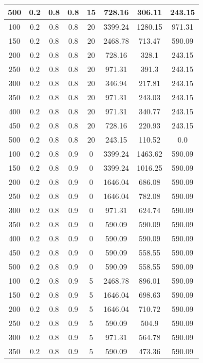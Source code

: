 \documentclass[a4paper, 12pt]{extreport}
\begin{document}
\begin{itemize}
\begin{longtable}{|c|c|c|c|c|c|c|c|}
			500 & 0.2 & 0.8 & 0.8 & 15 & 728.16 & 306.11 & 243.15 \\\hline
			100 & 0.2 & 0.8 & 0.8 & 20 & 3399.24 & 1280.15 & 971.31 \\\hline
			150 & 0.2 & 0.8 & 0.8 & 20 & 2468.78 & 713.47 & 590.09 \\\hline
			200 & 0.2 & 0.8 & 0.8 & 20 & 728.16 & 328.1 & 243.15 \\\hline
			250 & 0.2 & 0.8 & 0.8 & 20 & 971.31 & 391.3 & 243.15 \\\hline
			300 & 0.2 & 0.8 & 0.8 & 20 & 346.94 & 217.81 & 243.15 \\\hline
			350 & 0.2 & 0.8 & 0.8 & 20 & 971.31 & 243.03 & 243.15 \\\hline
			400 & 0.2 & 0.8 & 0.8 & 20 & 971.31 & 340.77 & 243.15 \\\hline
			450 & 0.2 & 0.8 & 0.8 & 20 & 728.16 & 220.93 & 243.15 \\\hline
			500 & 0.2 & 0.8 & 0.8 & 20 & 243.15 & 110.52 & 0.0 \\\hline
			100 & 0.2 & 0.8 & 0.9 & 0 & 3399.24 & 1463.62 & 590.09 \\\hline
			150 & 0.2 & 0.8 & 0.9 & 0 & 3399.24 & 1016.25 & 590.09 \\\hline
			200 & 0.2 & 0.8 & 0.9 & 0 & 1646.04 & 686.08 & 590.09 \\\hline
			250 & 0.2 & 0.8 & 0.9 & 0 & 1646.04 & 782.08 & 590.09 \\\hline
			300 & 0.2 & 0.8 & 0.9 & 0 & 971.31 & 624.74 & 590.09 \\\hline
			350 & 0.2 & 0.8 & 0.9 & 0 & 590.09 & 590.09 & 590.09 \\\hline
			400 & 0.2 & 0.8 & 0.9 & 0 & 590.09 & 590.09 & 590.09 \\\hline
			450 & 0.2 & 0.8 & 0.9 & 0 & 590.09 & 558.55 & 590.09 \\\hline
			500 & 0.2 & 0.8 & 0.9 & 0 & 590.09 & 558.55 & 590.09 \\\hline
			100 & 0.2 & 0.8 & 0.9 & 5 & 2468.78 & 896.01 & 590.09 \\\hline
			150 & 0.2 & 0.8 & 0.9 & 5 & 1646.04 & 698.63 & 590.09 \\\hline
			200 & 0.2 & 0.8 & 0.9 & 5 & 1646.04 & 710.72 & 590.09 \\\hline
			250 & 0.2 & 0.8 & 0.9 & 5 & 590.09 & 504.9 & 590.09 \\\hline
			300 & 0.2 & 0.8 & 0.9 & 5 & 971.31 & 564.78 & 590.09 \\\hline
			350 & 0.2 & 0.8 & 0.9 & 5 & 590.09 & 473.36 & 590.09 \\\hline

\end{longtable}
\end{itemize}
\end{document}
